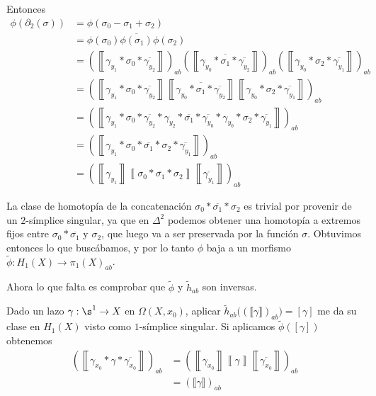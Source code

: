 Entonces \begin{align*}
	\phi(\partial_2(\sigma))&=\phi(\sigma_0 - \sigma_1 + \sigma_2)\\
	&=\phi(\sigma_0)\overline{\phi(\sigma_1)}\phi(\sigma_2)\\
	&=\left(\left\llbracket\gamma_{y_1} * \sigma_0 *\overline{\gamma_{y_2}}\right\rrbracket\right)_{ab} \left(\left\llbracket \overline{\gamma_{y_0}*\sigma_1*\overline{\gamma_{y_2}}}\right\rrbracket\right)_{ab}\left(\left\llbracket\gamma_{y_0}*\sigma_2*\overline{\gamma_{y_1}}\right\rrbracket\right)_{ab}\\
	&=\left(\left\llbracket\gamma_{y_1} * \sigma_0 *\overline{\gamma_{y_2}}\right\rrbracket \left\llbracket \overline{\gamma_{y_0}*\sigma_1*\overline{\gamma_{y_2}}}\right\rrbracket\left\llbracket\gamma_{y_0}*\sigma_2*\overline{\gamma_{y_1}}\right\rrbracket\right)_{ab}\\
	&=\left(\left\llbracket \gamma_{y_1} * \sigma_0 *\overline{\gamma_{y_2}} * \gamma_{y_2}*\overline{\sigma_1}*\overline{\gamma_{y_0}}*\gamma_{y_0}*\sigma_2*\overline{\gamma_{y_1}}\right\rrbracket\right)_{ab}\\
	&=\left(\left\llbracket\gamma_{y_1} * \sigma_0*\overline{\sigma_1}*\sigma_2*\overline{\gamma_{y_1}}\right\rrbracket\right)_{ab}\\
	&=\left(\left\llbracket\gamma_{y_1}\right\rrbracket\left\llbracket\sigma_0*\overline{\sigma_1}*\sigma_2\right\rrbracket\left\llbracket\overline{\gamma_{y_1}}\right\rrbracket\right)_{ab}
\end{align*}

La clase de homotopía de la concatenación $\sigma_0*\overline{\sigma_1}*\sigma_2$ es trivial por provenir de un $2$-símplice singular, ya que en $\Delta^2$ podemos obtener una homotopía a extremos fijos entre $\sigma_0 *\overline{\sigma_1}$ y $\sigma_2$, que luego va a ser preservada por la función $\sigma$. Obtuvimos entonces lo que buscábamos, y por lo tanto $\phi$ baja a un morfismo $\tilde{\phi}:H_1(X)\to\pi_1(X)_{ab}$.


Ahora lo que falta es comprobar que $\tilde{\phi}$ y $\tilde{h}_{ab}$ son inversas.

Dado un lazo $\gamma:\s^1\to X$ en $\Omega(X,x_0)$, aplicar $\tilde{h}_{ab}\big(\left(\llbracket\gamma\rrbracket\right)_{ab}\big)=[\gamma]$ me da su clase en $H_1(X)$ visto como $1$-símplice singular. Si aplicamos $\tilde{\phi}([\gamma])$ obtenemos \begin{align*}
\left(\left\llbracket\gamma_{x_0}*\gamma*\overline{\gamma_{x_0}}\right\rrbracket\right)_{ab}
&=\left(\left\llbracket\gamma_{x_0}\right\rrbracket\left\llbracket\gamma\right\rrbracket\left\llbracket\overline{\gamma_{x_0}}\right\rrbracket\right)_{ab}\\
&=\left(\llbracket\gamma\rrbracket\right)_{ab}\end{align*}

